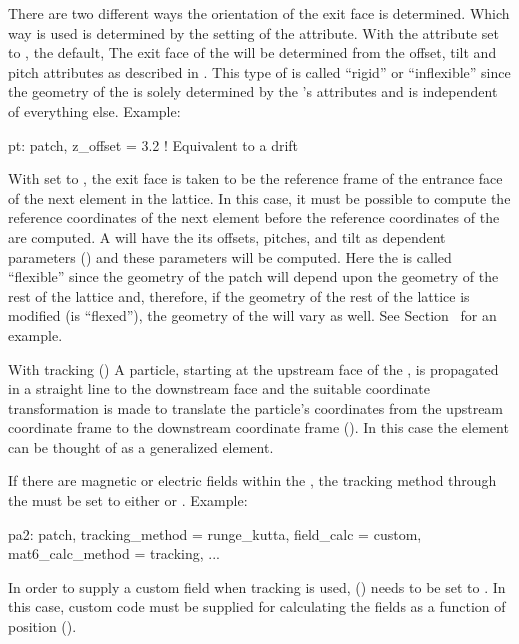 {
There are two different ways the orientation of the exit face is
determined. Which way is used is determined by the setting of the
 attribute.  With the  attribute set to
, the default, The exit face of the  will be
determined from the offset, tilt and pitch attributes as described in
. This type of  is called ``rigid'' or
``inflexible'' since the geometry of the  is solely
determined by the 's attributes and is independent of
everything else.  Example:
\begin{example}
  pt: patch, z_offset = 3.2   ! Equivalent to a drift
\end{example}

With  set to , the exit face is taken to be the
reference frame of the entrance face of the next element in the
lattice. In this case, it must be possible to compute the reference
coordinates of the next element before the reference coordinates of
the  are computed. A   will have the
its offsets, pitches, and tilt as dependent parameters
() and these parameters will be computed. Here the
 is called ``flexible'' since the geometry of the patch will
depend upon the geometry of the rest of the lattice and, therefore, if
the geometry of the rest of the lattice is modified (is ``flexed''),
the geometry of the  will vary as well. See
Section~ for an example.

With  tracking () A particle, starting
at the upstream face of the , is propagated in a straight
line to the downstream face and the suitable coordinate transformation
is made to translate the particle's coordinates from the upstream
coordinate frame to the downstream coordinate frame
(). In this case the  element can be
thought of as a generalized  element.

If there are magnetic or electric fields within the , the
tracking method through the  must be set to either
 or . Example:
\begin{example}
  pa2: patch, tracking_method = runge_kutta, field_calc = custom, 
              mat6_calc_method = tracking, ...
\end{example}
In order to supply a custom field when  tracking is
used,  () needs to be set to
. In this case, custom code must be supplied for
calculating the fields as a function of position
().

}
